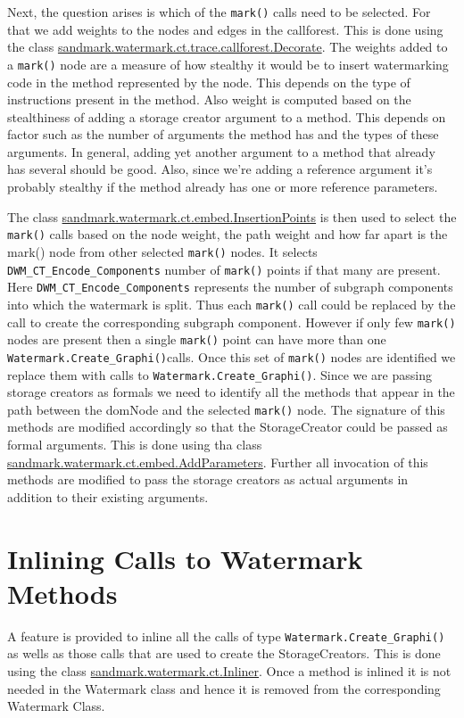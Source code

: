 Next, the question arises is which of the {\tt mark()} calls need to be selected. For that we add weights
to the nodes and edges in the callforest. This is done using the class
\url{sandmark.watermark.ct.trace.callforest.Decorate}. The weights added to a {\tt mark()} node are a
measure of  how stealthy it would be to insert watermarking code in the method represented by the
node. This depends on the type of instructions present in the method.
Also weight is computed based on the stealthiness of adding a storage creator argument to a
method. This depends on factor such as the number of arguments the method has and the types of
these arguments. In general, adding yet another argument to a method that already has several
should be good. Also, since we're adding a reference argument it's probably stealthy if the method
already has one or more reference parameters.

The class \url{sandmark.watermark.ct.embed.InsertionPoints} is then used to select the {\tt mark()} calls
based on the node weight, the path weight and how far apart is the mark() node from other selected {\tt mark()} nodes. It selects {\tt DWM\_CT\_Encode\_Components} number of {\tt mark()} points if that many are present. Here {\tt DWM\_CT\_Encode\_Components} represents the number of subgraph components into which the watermark is split. Thus each {\tt mark()} call could be replaced by the call to create the corresponding  subgraph component.
However if only few {\tt mark()} nodes are present then a single {\tt mark()} point can have more than one {\tt Watermark.Create\_Graphi()}calls. Once this set of {\tt mark()} nodes are identified we replace them with calls to {\tt Watermark.Create\_Graphi()}. 
Since we are passing storage creators as formals we need to identify all the methods that appear in the path
between the domNode and the selected {\tt mark()} node. The signature of this methods are modified accordingly so that the StorageCreator could be passed as formal arguments. This is done using tha class \url{sandmark.watermark.ct.embed.AddParameters}. Further all invocation of this methods are modified to pass the  storage creators as actual arguments in addition to their existing arguments.

\section{Inlining Calls to Watermark Methods}
A feature is provided to inline all the calls of type {\tt Watermark.Create\_Graphi()} as wells as those calls that are used to create the StorageCreators. This is done using the class \url{sandmark.watermark.ct.Inliner}. Once a method is inlined it is not needed in the Watermark class and hence it is removed from the corresponding Watermark Class.

